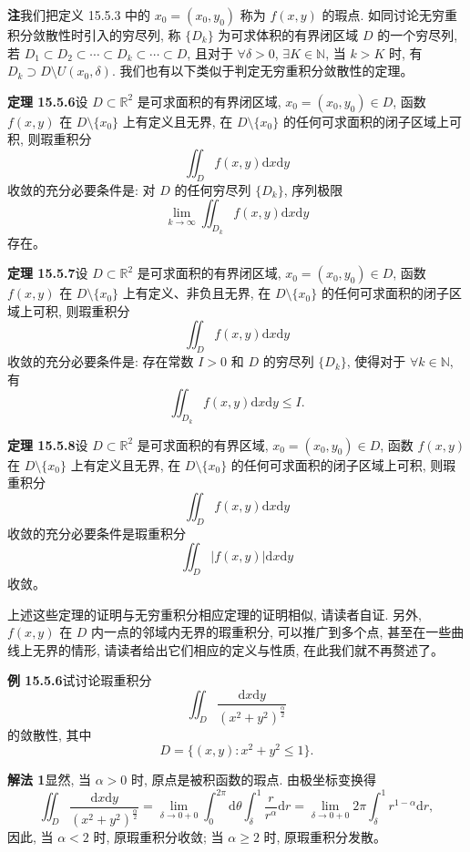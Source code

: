 \documentclass[UTF8,12pt,a4paper,fontset=fandol]{ctexart}
\begin{document}
\noindent\textbf{注}\quad 我们把定义 15.5.3 中的 $x_0=(x_0,y_0)$ 称为 $f(x,y)$ 的瑕点. 如同讨论无穷重积分敛散性时引入的穷尽列, 称 $\{D_k\}$ 为可求体积的有界闭区域 $D$ 的一个穷尽列, 若 $D_1\subset D_2\subset\cdots\subset D_k\subset\cdots\subset D$, 且对于 $\forall\delta>0$, $\exists K\in\mathbb N$, 当 $k>K$ 时, 有 $D_k\supset D\setminus U(x_0,\delta)$. 我们也有以下类似于判定无穷重积分敛散性的定理。

\noindent\textbf{定理 15.5.6}\quad 设 $D\subset\mathbb R^2$ 是可求面积的有界闭区域, $x_0=(x_0,y_0)\in D$, 函数 $f(x,y)$ 在 $D\setminus\{x_0\}$ 上有定义且无界, 在 $D\setminus\{x_0\}$ 的任何可求面积的闭子区域上可积, 则瑕重积分
\[
  \iint_D f(x,y)\mathrm dx\mathrm dy
\]
收敛的充分必要条件是: 对 $D$ 的任何穷尽列 $\{D_k\}$, 序列极限
\[
  \lim_{k\to\infty}\iint_{D_k}f(x,y)\mathrm dx\mathrm dy
\]
存在。

\noindent\textbf{定理 15.5.7}\quad 设 $D\subset\mathbb R^2$ 是可求面积的有界闭区域, $x_0=(x_0,y_0)\in D$, 函数 $f(x,y)$ 在 $D\setminus\{x_0\}$ 上有定义、非负且无界, 在 $D\setminus\{x_0\}$ 的任何可求面积的闭子区域上可积, 则瑕重积分
\[
  \iint_D f(x,y)\mathrm dx\mathrm dy
\]
收敛的充分必要条件是: 存在常数 $I>0$ 和 $D$ 的穷尽列 $\{D_k\}$, 使得对于 $\forall k\in\mathbb N$, 有
\[
  \iint_{D_k}f(x,y)\mathrm dx\mathrm dy\leqslant I.
\]

\noindent\textbf{定理 15.5.8}\quad 设 $D\subset\mathbb R^2$ 是可求面积的有界区域, $x_0=(x_0,y_0)\in D$, 函数 $f(x,y)$ 在 $D\setminus\{x_0\}$ 上有定义且无界, 在 $D\setminus\{x_0\}$ 的任何可求面积的闭子区域上可积, 则瑕重积分
\[
  \iint_D f(x,y)\mathrm dx\mathrm dy
\]
收敛的充分必要条件是瑕重积分
\[
  \iint_D |f(x,y)|\mathrm dx\mathrm dy
\]
收敛。

上述这些定理的证明与无穷重积分相应定理的证明相似, 请读者自证. 另外, $f(x,y)$ 在 $D$ 内一点的邻域内无界的瑕重积分, 可以推广到多个点, 甚至在一些曲线上无界的情形, 请读者给出它们相应的定义与性质, 在此我们就不再赘述了。

\noindent\textbf{例 15.5.6}\quad 试讨论瑕重积分
\[
  \iint_D\frac{\mathrm dx\mathrm dy}{(x^2+y^2)^{\frac\alpha2}}
\]
的敛散性, 其中
\[
  D=\{(x,y):x^2+y^2\leqslant1\}.
\]

\noindent\textbf{解法 1}\quad 显然, 当 $\alpha>0$ 时, 原点是被积函数的瑕点. 由极坐标变换得
\[
  \iint_D\frac{\mathrm dx\mathrm dy}{(x^2+y^2)^{\frac\alpha2}}
  =\lim_{\delta\to0+0}\int_0^{2\pi}\mathrm d\theta\int_\delta^1\frac r{r^\alpha}\mathrm dr
  =\lim_{\delta\to0+0}2\pi\int_\delta^1r^{1-\alpha}\mathrm dr,
\]
因此, 当 $\alpha<2$ 时, 原瑕重积分收敛; 当 $\alpha\geqslant2$ 时, 原瑕重积分发散。
\end{document}
